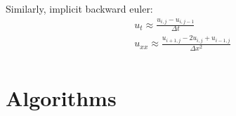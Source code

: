 \documentclass[%
oneside,                 %
final,                   %
10pt]{article}
\begin{document}
Similarly, implicit backward euler:
\begin{align}
u_t \approx \frac{u_{i,j} -u_{i,j-1}}{\Delta t} \\
u_{xx} \approx \frac{u_{i+1,j} -2u_{i,j}+u_{i-1,j}}{\Delta x^2}\\
\end{align}


\section{Algorithms}
\label{sec:M.Algo}
\end{document}
